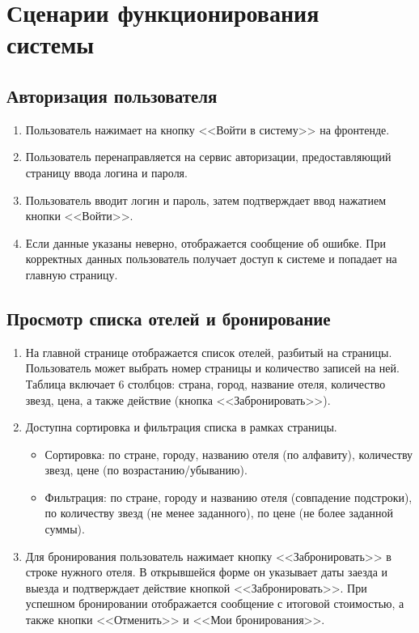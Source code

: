 \section{Сценарии функционирования системы}

\subsection{Авторизация пользователя}
\begin{enumerate}
	\item Пользователь нажимает на кнопку <<Войти в систему>> на фронтенде.
	\item Пользователь перенаправляется на сервис авторизации, предоставляющий страницу ввода логина и пароля.
	\item Пользователь вводит логин и пароль, затем подтверждает ввод нажатием кнопки <<Войти>>.
	\item Если данные указаны неверно, отображается сообщение об ошибке.  
	При корректных данных пользователь получает доступ к системе и попадает на главную страницу.
\end{enumerate}

\subsection{Просмотр списка отелей и бронирование}
\begin{enumerate}
	\item На главной странице отображается список отелей, разбитый на страницы.  
	Пользователь может выбрать номер страницы и количество записей на ней.  
	Таблица включает 6 столбцов: страна, город, название отеля, количество звезд, цена, а также действие (кнопка <<Забронировать>>).
	\item Доступна сортировка и фильтрация списка в рамках страницы.  
	\begin{itemize}
		\item Сортировка: по стране, городу, названию отеля (по алфавиту), количеству звезд, цене (по возрастанию/убыванию).  
		\item Фильтрация: по стране, городу и названию отеля (совпадение подстроки), по количеству звезд (не менее заданного), по цене (не более заданной суммы).
	\end{itemize}
	\item Для бронирования пользователь нажимает кнопку <<Забронировать>> в строке нужного отеля.  
	В открывшейся форме он указывает даты заезда и выезда и подтверждает действие кнопкой <<Забронировать>>.  
	При успешном бронировании отображается сообщение с итоговой стоимостью, а также кнопки <<Отменить>> и <<Мои бронирования>>.
\end{enumerate}

